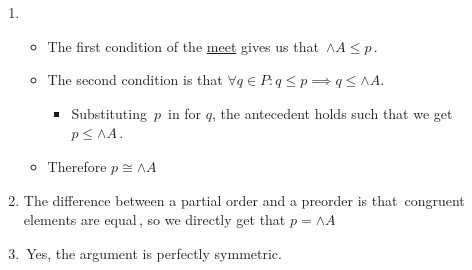 \begin{enumerate}
    \item \begin{itemize}
            \item The first condition of the \href{doc/1 math/Seven Sketches in Compositionality/Chapter 1: Generative Effects/5 Meets and joins/1 Definition and basic examples/Meet and join}{meet} gives us that \,$\wedge A \leq p$\,.
            \item The second condition is that $\forall q \in P: q \leq p \implies q \leq \wedge A$.
                  \begin{itemize}
                    \item Substituting \,$p$\, in for $q$, the antecedent holds such that we get \,$p \leq \wedge A$\,.
                  \end{itemize}
            \item Therefore $p \cong \wedge A$
          \end{itemize}
    \item The difference between a partial order and a preorder is that \,congruent elements are equal\,, so we directly get that $p = \wedge A$
    \item \,Yes, the argument is perfectly symmetric.\,
  \end{enumerate}